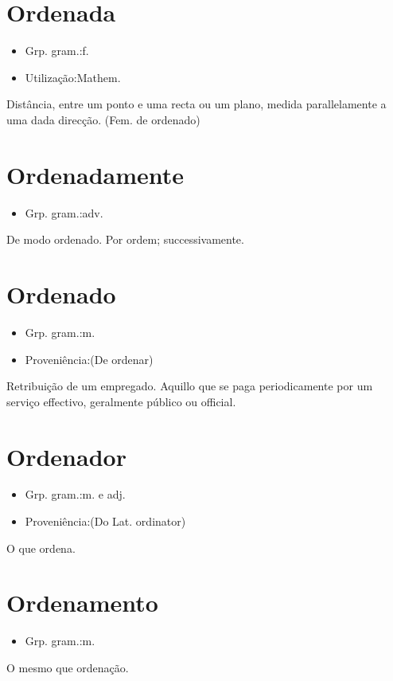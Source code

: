 \section{Ordenada}
\begin{itemize}
\item {Grp. gram.:f.}
\end{itemize}
\begin{itemize}
\item {Utilização:Mathem.}
\end{itemize}
Distância, entre um ponto e uma recta ou um plano, medida parallelamente a uma dada direcção.
(Fem. de \textunderscore ordenado\textunderscore )
\section{Ordenadamente}
\begin{itemize}
\item {Grp. gram.:adv.}
\end{itemize}
De modo ordenado.
Por ordem; successivamente.
\section{Ordenado}
\begin{itemize}
\item {Grp. gram.:m.}
\end{itemize}
\begin{itemize}
\item {Proveniência:(De \textunderscore ordenar\textunderscore )}
\end{itemize}
Retribuição de um empregado.
Aquillo que se paga periodicamente por um serviço effectivo, geralmente público ou official.
\section{Ordenador}
\begin{itemize}
\item {Grp. gram.:m.  e  adj.}
\end{itemize}
\begin{itemize}
\item {Proveniência:(Do Lat. \textunderscore ordinator\textunderscore )}
\end{itemize}
O que ordena.
\section{Ordenamento}
\begin{itemize}
\item {Grp. gram.:m.}
\end{itemize}
O mesmo que \textunderscore ordenação\textunderscore .
